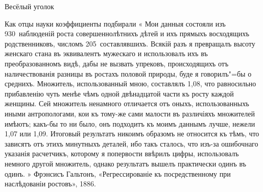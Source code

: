 Весёлый уголок

Как отцы науки коэффициенты подбирали
«
Мои данныя состояли изъ 930~наблюденій роста совершеннолѣтнихъ дѣтей и ихъ прямыхъ восходящихъ родственниковъ, числомъ 205~составлявшихъ. Всякій разъ я превращалъ высоту женскаго стана въ эквивалентъ мужескаго и использовалъ ихъ въ преобразованномъ видѣ, дабы не вызвать упрековъ, происходящихъ отъ наличествованія разницы въ ростахъ половой природы, буде я говорилъ"=бы о среднихъ. Множитель, использованный мною, составлялъ 1,08, что равносильно прибавленію чуть менѣе чѣмъ одной двѣнадцатой части къ росту каждой женщины. Сей множитель ненамного отличается отъ оныхъ, использованныхъ иными антропологами, кои къ тому-же сами малости въ различіяхъ множителей имѣютъ; какъ-бы то ни было, онъ подходитъ къ моимъ даннымъ лучше, нежели 1,07 или 1,09. Итоговый результатъ никоимъ образомъ не относится къ тѣмъ, что зависятъ отъ этихъ минутныхъ деталей, ибо такъ сталось, что изъ-за ошибочнаго указанія расчетчикъ, которому я попервости ввѣрилъ цифры, использовалъ немного другой множитель, однако результатъ вышелъ практически одинъ въ одинъ. 
»
Фрэнсисъ Гальтонъ, «Регрессированіе къ посредственному при наслѣдованіи ростовъ», 1886.

